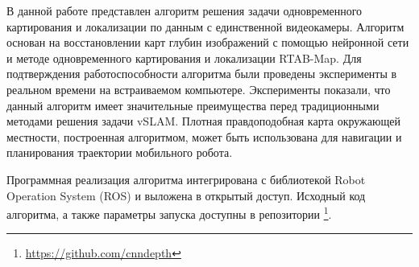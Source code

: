 \documentclass{mipt-thesis-bs}
\begin{document}
В данной работе представлен алгоритм решения задачи одновременного картирования и локализации по данным с единственной видеокамеры. Алгоритм основан на восстановлении карт глубин изображений с помощью нейронной сети и методе одновременного картирования и локализации RTAB-Map. Для подтверждения работоспособности алгоритма были проведены эксперименты в реальном времени на встраиваемом компьютере. Эксперименты показали, что данный алгоритм имеет значительные преимущества перед традиционными методами решения задачи vSLAM. Плотная правдоподобная карта окружающей местности, построенная алгоритмом, может быть использована для навигации и планирования траектории мобильного робота.

Программная реализация алгоритма интегрирована с библиотекой Robot Operation System (ROS) и выложена в открытый доступ. Исходный код алгоритма, а также параметры запуска доступны в репозитории \footnote{\href{https://github.com/cnndepth}{https://github.com/cnndepth}}.

\backmatter
\printbib
\end{document}
